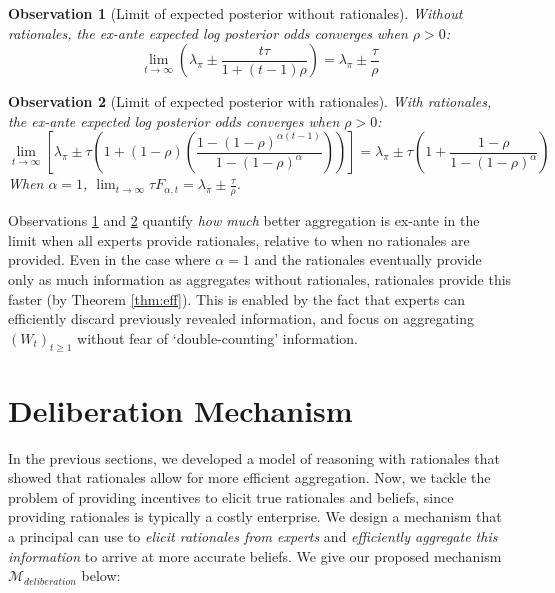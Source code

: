 \documentclass{winnower}
\newtheorem{observation}{Observation}
\begin{document}
\begin{observation}[Limit of expected posterior without rationales] \label{obs:norat}
    Without rationales, the ex-ante expected log posterior odds converges when $\rho > 0$:
    {\small
    \begin{equation}
    \lim_{t\to \infty} \left(\lambda_\pi \pm \frac{t\tau}{1+(t-1)\rho} \right)= \lambda_\pi \pm \frac{\tau}{\rho}
    \end{equation}
    }
\end{observation}

\begin{observation}[Limit of expected posterior with rationales]\label{obs:withrat}
    With rationales, the ex-ante expected log posterior odds converges when $\rho > 0$:
    {\small
    \begin{equation}
        \lim_{t\to\infty} \left[ \lambda_\pi \pm \tau\left(1 + (1-\rho)\left(\frac{1-(1-\rho)^{\alpha(t-1)}}{1-(1-\rho)^\alpha}\right)\right) \right] = \lambda_\pi \pm \tau\left(1 + \frac{1-\rho}{1-(1-\rho)^\alpha}\right)
    \end{equation}
    }
    When $\alpha = 1$, $\lim_{t \to \infty} \tau F_{\alpha, t} = \lambda_\pi \pm \frac{\tau}{\rho}$.
\end{observation}

Observations \ref{obs:norat} and \ref{obs:withrat} quantify \emph{how much} better aggregation is ex-ante in the limit when all experts provide rationales, relative to when no rationales are provided. Even in the case where $\alpha=1$ and the rationales eventually provide only as much information as aggregates without rationales, rationales provide this faster (by Theorem \ref{thm:eff}). This is enabled by the fact that experts can efficiently discard previously revealed information, and focus on aggregating $(W_t)_{t\geq 1}$ without fear of `double-counting' information.


\section{Deliberation Mechanism}\label{sec:mechanism}

In the previous sections, we developed a model of reasoning with rationales that showed that rationales allow for more efficient aggregation. Now, we tackle the problem of providing incentives to elicit true rationales and beliefs, since providing rationales is typically a costly enterprise. We design a mechanism that a principal can use to \emph{elicit rationales from experts} and \emph{efficiently aggregate this information} to arrive at more accurate beliefs. We give our proposed mechanism $\mathcal{M}_{deliberation}$ below:
\end{document}
